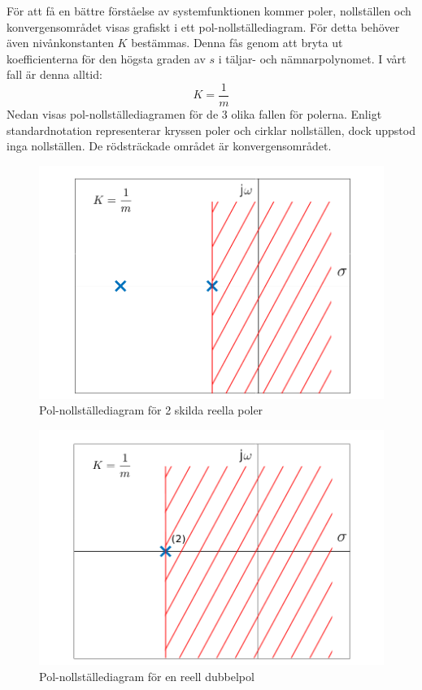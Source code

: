För att få en bättre förståelse av systemfunktionen kommer poler, nollställen och konvergensområdet visas grafiskt i ett pol-nollställediagram. För detta behöver även nivånkonstanten $K$ bestämmas. Denna fås genom att bryta ut koefficienterna för den högsta graden av $s$ i täljar- och nämnarpolynomet. I vårt fall är denna alltid:
$$K=\frac{1}{m}$$
Nedan visas pol-nollställediagramen för de 3 olika fallen för polerna. Enligt standardnotation representerar kryssen poler och cirklar nollställen, dock uppstod inga nollställen. De rödsträckade området är konvergensområdet.

\begin{figure}[H] 
    \centering
    \includegraphics[scale=0.33]{bilder/pol_nollstallediagram_2_poler}
    \caption{Pol-nollställediagram för 2 skilda reella poler}
    \label{fig:pol_nollstallediagram_2_poler}
\end{figure}
\begin{figure}[H] 
    \centering
    \includegraphics[scale=0.33]{bilder/pol_nollstallediagram_dubbelpol}
    \caption{Pol-nollställediagram för en reell dubbelpol}
    \label{fig:pol_nollstallediagram_dubbelpol}
\end{figure}
